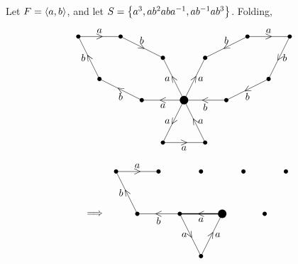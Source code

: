 \pagebreak

\begin{example}
Let $ F = \abr{a, b} $, and let $ S = \cbr{a^3, ab^2aba^{-1}, ab^{-1}ab^3} $. Folding,
$$
\begin{tikzpicture}[scale=1.5]
\fill (0, 0) circle (0.1);
\fill (-0.5, -1) circle (0.05);
\fill (0.5, -1) circle (0.05);
\fill (-1, 0) circle (0.05);
\fill (-2, 0.5) circle (0.05);
\fill (-2.5, 1.5) circle (0.05);
\fill (-1.5, 1.5) circle (0.05);
\fill (-0.5, 1) circle (0.05);
\fill (0.5, 1) circle (0.05);
\fill (1.5, 1.5) circle (0.05);
\fill (2.5, 1.5) circle (0.05);
\fill (2, 0.5) circle (0.05);
\fill (1, 0) circle (0.05);
\draw (0, 0) to node{\rotatebox{60}{$ < $}} node[left]{$ a $} (-0.5, -1);
\draw (-0.5, -1) to node{$ > $} node[below]{$ a $} (0.5, -1);
\draw (0.5, -1) to node{\rotatebox{30}{$ \wedge $}} node[right]{$ a $} (0, 0);
\draw (0, 0) to node{$ < $} node[below]{$ a $} (-1, 0);
\draw (-1, 0) to node{\rotatebox{60}{$ \wedge $}} node[below]{$ b $} (-2, 0.5);
\draw (-2, 0.5) to node{\rotatebox{30}{$ \wedge $}} node[left]{$ b $} (-2.5, 1.5);
\draw (-2.5, 1.5) to node{$ > $} node[above]{$ a $} (-1.5, 1.5);
\draw (-1.5, 1.5) to node{\rotatebox{60}{$ \vee $}} node[above]{$ b $} (-0.5, 1);
\draw (0, 0) to node{\rotatebox{30}{$ \wedge $}} node[left]{$ a $} (-0.5, 1);
\draw (0, 0) to node{\rotatebox{60}{$ > $}} node[right]{$ a $} (0.5, 1);
\draw (1.5, 1.5) to node{\rotatebox{30}{$ < $}} node[above]{$ b $} (0.5, 1);
\draw (1.5, 1.5) to node{$ > $} node[above]{$ a $} (2.5, 1.5);
\draw (2.5, 1.5) to node{\rotatebox{60}{$ < $}} node[right]{$ b $} (2, 0.5);
\draw (2, 0.5) to node{\rotatebox{30}{$ < $}} node[below]{$ b $} (1, 0);
\draw (1, 0) to node{$ < $} node[below]{$ b $} (0, 0);
\end{tikzpicture}
$$
$$
\begin{tikzpicture}[scale=1.5]
\draw (-3, 0) node{$ \implies $};
\fill (0, 0) circle (0.1);
\fill (-1, 0) circle (0.05);
\fill (-0.5, -1) circle (0.05);
\fill (-2, 0) circle (0.05);
\fill (-2.5, 1) circle (0.05);
\fill (-1.5, 1) circle (0.05);
\fill (-0.5, 1) circle (0.05);
\fill (0.5, 1) circle (0.05);
\fill (1.5, 1) circle (0.05);
\fill (1, 0) circle (0.05);
\draw [very thick] (0, 0) to node{$ < $} node[below]{$ a $} (-1, 0);
\draw (-1, 0) to node{\rotatebox{30}{$ \vee $}} node[left]{$ a $} (-0.5, -1);
\draw (-0.5, -1) to node{\rotatebox{60}{$ > $}} node[right]{$ a $} (0, 0);
\draw (-1, 0) to node{$ < $} node[below]{$ b $} (-2, 0);
\draw (-2, 0) to node{\rotatebox{30}{$ \wedge $}} node[left]{$ b $} (-2.5, 1);
\draw (-2.5, 1) to node{$ > $} node[above]{$ a $} (-1.5, 1);

\end{tikzpicture}$$
\end{example}
